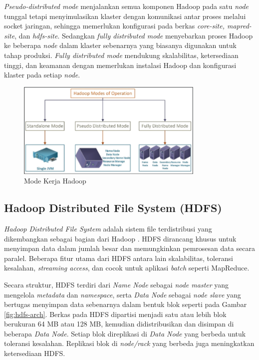 \textit{Pseudo-distributed mode} menjalankan semua komponen Hadoop pada satu \textit{node} tunggal tetapi menyimulasikan klaster dengan komunikasi antar proses melalui socket jaringan, sehingga memerlukan konfigurasi pada berkas \textit{core-site, mapred-site}, dan \textit{hdfs-site}. Sedangkan \textit{fully distributed mode} menyebarkan proses Hadoop ke beberapa \textit{node} dalam klaster sebenarnya yang biasanya digunakan untuk tahap produksi. \textit{Fully distributed mode} mendukung skalabilitas, ketersediaan tinggi, dan keamanan dengan memerlukan instalasi Hadoop dan konfigurasi klaster pada setiap \textit{node}.

\begin{figure}[h]
    \centering
    \includegraphics[width=0.8\textwidth]{figures/ch02/hadoop-modes}
    \caption{Mode Kerja Hadoop \cite{khataiImplementationTextMining2021}}
    \label{fig:hadoop-modes}
\end{figure}

\subsection{Hadoop Distributed File System (HDFS)}
\textit{Hadoop Distributed File System} adalah sistem file terdistribusi yang dikembangkan sebagai bagian dari Hadoop \cite{abhishekIntegratedHadoopCloud2017}. HDFS dirancang khusus untuk menyimpan data dalam jumlah besar dan memungkinkan pemrosesan data secara paralel. Beberapa fitur utama dari HDFS antara lain skalabilitas, toleransi kesalahan, \textit{streaming access}, dan cocok untuk aplikasi \textit{batch} seperti MapReduce.

Secara struktur, HDFS terdiri dari \textit{Name Node} sebagai \textit{node master} yang mengelola \textit{metadata} dan \textit{namespace}, serta \textit{Data Node} sebagai \textit{node slave} yang bertugas menyimpan data sebenarnya dalam bentuk blok seperti pada Gambar \ref{fig:hdfs-arch}. Berkas pada HDFS dipartisi menjadi satu atau lebih blok berukuran 64 MB atau 128 MB, kemudian didistribusikan dan disimpan di beberapa \textit{Data Node}. Setiap blok direplikasi di \textit{Data Node} yang berbeda untuk toleransi kesalahan. Replikasi blok di \textit{node/rack} yang berbeda juga meningkatkan ketersediaan HDFS.

